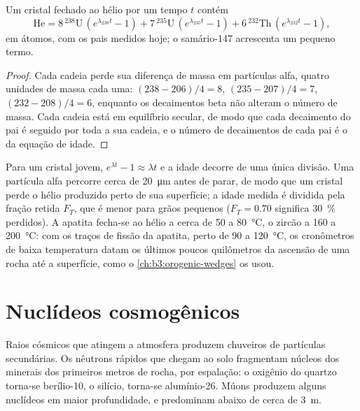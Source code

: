 \begin{theorem}\label{thm:b3:advanced-geochronology:helium}
Um cristal fechado ao hélio por um tempo $t$ contém
\[
\mathrm{He} = 8\,{}^{238}\mathrm U\,(e^{\lambda_{238}t} - 1)
+ 7\,{}^{235}\mathrm U\,(e^{\lambda_{235}t} - 1)
+ 6\,{}^{232}\mathrm{Th}\,(e^{\lambda_{232}t} - 1),
\]
em átomos, com os pais medidos hoje; o samário-147 acrescenta um pequeno termo.
\end{theorem}

\begin{proof}
Cada cadeia perde sua diferença de massa em partículas alfa, quatro unidades de massa cada uma:
$(238 - 206)/4 = 8$, $(235 - 207)/4 = 7$, $(232 - 208)/4 = 6$, enquanto os
decaimentos beta não alteram o número de massa. Cada cadeia está em equilíbrio
secular, de modo que cada decaimento do pai é seguido por toda a sua cadeia, e o
número de decaimentos de cada pai é o da equação de idade.
\end{proof}

Para um cristal jovem, $e^{\lambda t} - 1 \approx \lambda t$ e a idade decorre
de uma única divisão. Uma partícula alfa percorre cerca de
\qty{20}{\micro\metre} antes de parar, de modo que um cristal perde o hélio
produzido perto de sua superfície; a idade medida é dividida pela fração
retida $F_T$, que é menor para grãos pequenos ($F_T = 0.70$ significa \qty{30}{\percent}
perdidos). A apatita fecha-se ao hélio a cerca de 50 a \qty{80}{\celsius}, o zircão a
160 a \qty{200}{\celsius}: com os traços de fissão da apatita, perto de 90 a
\qty{120}{\celsius}, os cronômetros de baixa temperatura datam os últimos poucos
quilômetros da ascensão de uma rocha até a superfície, como
o \cref{ch:b3:orogenic-wedges} os usou.

\section{Nuclídeos cosmogênicos}\label{sec:b3:advanced-geochronology:cosmogenic}

Raios cósmicos que atingem a atmosfera produzem chuveiros de partículas
secundárias. Os nêutrons rápidos que chegam ao solo fragmentam núcleos dos minerais dos
primeiros metros de rocha, por espalação: o oxigênio do quartzo torna-se berílio-10, o silício,
torna-se alumínio-26. Múons produzem alguns nuclídeos em maior profundidade, e predominam
abaixo de cerca de \qty{3}{m}.

